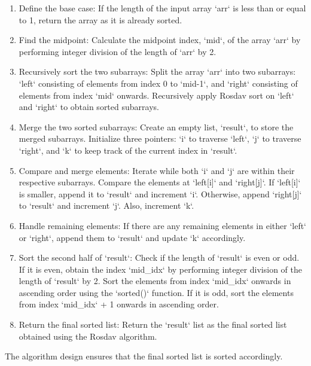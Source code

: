 \documentclass[12pt]{article}
\begin{document}
\begin{enumerate}

\item  Define the base case: If the length of the input array `arr` is less than or equal to 1, return the array as it is already sorted.

\item  Find the midpoint: Calculate the midpoint index, `mid`, of the array `arr` by performing integer division of the length of `arr` by 2.

\item  Recursively sort the two subarrays: Split the array `arr` into two subarrays: `left` consisting of elements from index 0 to `mid-1`, and `right` consisting of elements from index `mid` onwards. Recursively apply Rosdav sort on `left` and `right` to obtain sorted subarrays.

\item  Merge the two sorted subarrays: Create an empty list, `result`, to store the merged subarrays. Initialize three pointers: `i` to traverse `left`, `j` to traverse `right`, and `k` to keep track of the current index in `result`.

\item  Compare and merge elements: Iterate while both `i` and `j` are within their respective subarrays. Compare the elements at `left[i]` and `right[j]`. If `left[i]` is smaller, append it to `result` and increment `i`. Otherwise, append `right[j]` to `result` and increment `j`. Also, increment `k`.

\item  Handle remaining elements: If there are any remaining elements in either `left` or `right`, append them to `result` and update `k` accordingly.

\item  Sort the second half of `result`: Check if the length of `result` is even or odd. If it is even, obtain the index `mid\_idx` by performing integer division of the length of `result` by 2. Sort the elements from index `mid\_idx` onwards in ascending order using the `sorted()` function. If it is odd, sort the elements from index `mid\_idx` + 1 onwards in ascending order.

\item  Return the final sorted list: Return the `result` list as the final sorted list obtained using the Rosdav algorithm.
\end{enumerate}

The algorithm design ensures that the final sorted list is sorted accordingly.
\end{document}
